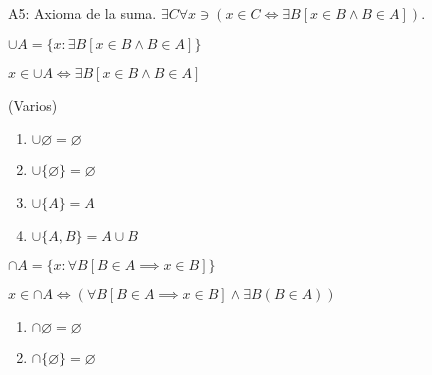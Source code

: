 \begin{cajita}
	A5: Axioma de la suma. $\exists C\forall x \ni (x\in C\iff \exists B[x\in B \wedge B\in A])$.
\end{cajita}


\begin{definicion}
	$\cup A=\{x:\exists B[x\in B\wedge B\in A]\}$
\end{definicion}

\begin{teorema}
	$x\in \cup A\iff \exists B[x\in B\wedge B\in A]$
\end{teorema}

\begin{teorema}(Varios)
	\begin{enumerate}
		\item $\cup \varnothing = \varnothing$
		\item $\cup \{\varnothing\}=\varnothing$
		\item $\cup \{A\}=A$
		\item $\cup \{A,B\}=A \cup B$
	\end{enumerate}
\end{teorema}

\begin{definicion}
	$\cap A=\{x:\forall B[B\in A\implies x\in B]\}$
\end{definicion}

\begin{teorema}
	$x\in \cap A\iff (\forall B[B\in A \implies x\in B]\wedge \exists B(B\in A))$
\end{teorema}

\begin{teorema}
	\begin{enumerate}
		\item $\cap \varnothing= \varnothing$
		\item $\cap \{\varnothing\}=\varnothing$
	\end{enumerate}
\end{teorema}
